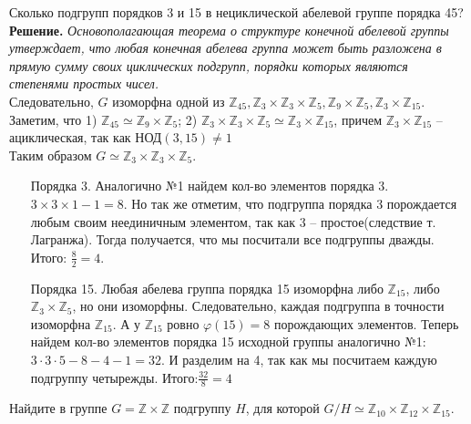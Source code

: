 \documentclass[a4paper, 12pt]{article}
\begin{document}
\begin{spacing}{1}
\begin{center}
\end{center}

\noindent Сколько подгрупп порядков 3 и 15 в нециклической абелевой группе порядка 45?\\

\noindent \textbf{Решение.} \textit{Основополагающая теорема о структуре конечной абелевой группы утверждает, что любая конечная абелева группа может быть разложена в прямую сумму своих циклических подгрупп, порядки которых являются степенями простых чисел.}\\
\noindent Следовательно, $G$ изоморфна одной из $\mathbb{Z}_{45},\mathbb{Z}_3 \times \mathbb{Z}_3 \times \mathbb{Z}_5, \mathbb{Z}_9 \times \mathbb{Z}_5, \mathbb{Z}_3 \times \mathbb{Z}_{15}$.\\
Заметим, что 1) $\mathbb{Z}_{45}\simeq\mathbb{Z}_9 \times\mathbb{Z}_5$;
2) $\mathbb{Z}_3 \times \mathbb{Z}_3 \times \mathbb{Z}_5 \simeq \mathbb{Z}_3 \times \mathbb{Z}_{15}$, причем $\mathbb{Z}_3 \times \mathbb{Z}_{15}$ -- ациклическая, так как $\text{НОД}(3, 15) \neq 1$\\
Таким образом $G \simeq \mathbb{Z}_3 \times \mathbb{Z}_3 \times \mathbb{Z}_5$.
\begin{enumerate}
	\item[Порядка 3.] Аналогично №1 найдем кол-во элементов порядка 3. $3\times3\times1 - 1 = 8$. Но так же отметим, что подгруппа порядка 3 порождается любым своим неединичным элементом, так как 3 -- простое(следствие т. Лагранжа). Тогда получается, что мы посчитали все подгруппы дважды. Итого: $\frac{8}{2} = 4$.
	
	\item[Порядка 15.] Любая абелева группа порядка 15 изоморфна либо $\mathbb{Z}_{15}$, либо $\mathbb{Z}_3 \times \mathbb{Z}_5$, но они изоморфны. Следовательно, каждая подгруппа в точности изоморфна $\mathbb{Z}_{15}$. А у $\mathbb{Z}_{15}$ ровно $\varphi(15) = 8$ порождающих элементов. Теперь найдем кол-во элементов порядка 15 исходной группы аналогично №1: $3\cdot3\cdot5 - 8 - 4 - 1 = 32$. И разделим на 4, так как мы посчитаем каждую подгруппу четырежды. Итого:$\frac{32}{8} = 4$
\end{enumerate}


\begin{center}
\end{center}

\noindent Найдите в группе $G = \mathbb{Z}\times \mathbb{Z}$ подгруппу $H$, для которой $G/H\simeq\mathbb{Z}_{10}\times\mathbb{Z}_{12}\times\mathbb{Z}_{15}$.\\


\end{spacing}
\end{document}
